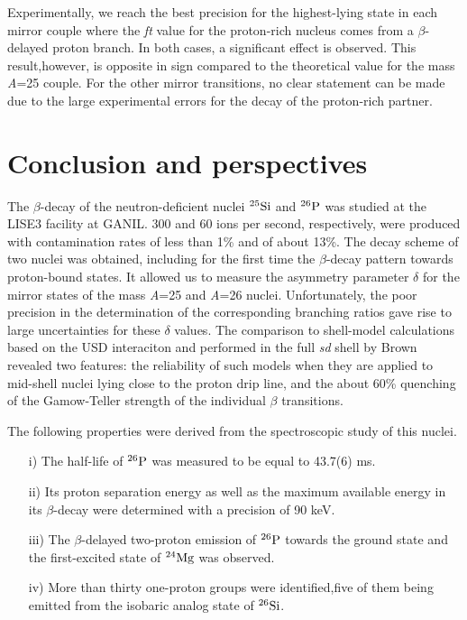 \documentclass[a4paper]{article}
\begin{document}
Experimentally, we reach the best precision for the highest-lying state in each mirror couple where the \textit{ft} value for the proton-rich nucleus comes from a $\beta$-delayed proton branch. In both cases, a significant effect is observed. This result,however, is opposite in sign compared to the theoretical value for the mass \textit{A}=25 couple. For the other mirror transitions, no clear statement can be made due to the large experimental errors for the decay of the proton-rich partner.
\section{Conclusion and perspectives}
The $\beta$-decay of the neutron-deficient nuclei $^{25}\textnormal{Si}$ and $^{26}\textnormal{P}$ was studied at the LISE3 facility at GANIL. 300 and 60 ions per second, respectively, were produced with contamination rates of less than 1\% and of about 13\%. The decay scheme of two nuclei was obtained, including for the first
time the $\beta$-decay pattern towards proton-bound states. It allowed us to measure the asymmetry parameter $\delta$ for the mirror states of the mass \textit{A}=25 and \textit{A}=26 nuclei. Unfortunately, the poor precision in the determination of the corresponding branching ratios gave rise to large uncertainties for these $\delta$ values. The comparison to shell-model calculations based on the USD interaciton and performed in the full \textit{sd} shell by Brown revealed two features: the reliability of such models when they are applied to mid-shell nuclei lying close to the proton drip line, and the about 60\% quenching of the Gamow-Teller strength of the individual $\beta$ transitions.

The following properties were derived from the spectroscopic study of this nuclei.
\begin{itemize}
    \item[i)] The half-life of $^{26}\textnormal{P}$ was measured to be equal to 43.7(6) ms.
    \item[ii)] Its proton separation energy as well as the maximum available energy in its $\beta$-decay were determined with a precision of 90 keV. 
    \item[iii)] The $\beta$-delayed two-proton emission of $^{26}\textnormal{P}$ towards the ground state and the first-excited state of $^{24}\textnormal{Mg}$ was observed.
    \item[iv)] More than thirty one-proton groups were identified,five of them being emitted from the isobaric analog state of $^{26}\textnormal{Si}$.    
\end{itemize}
\end{document}
